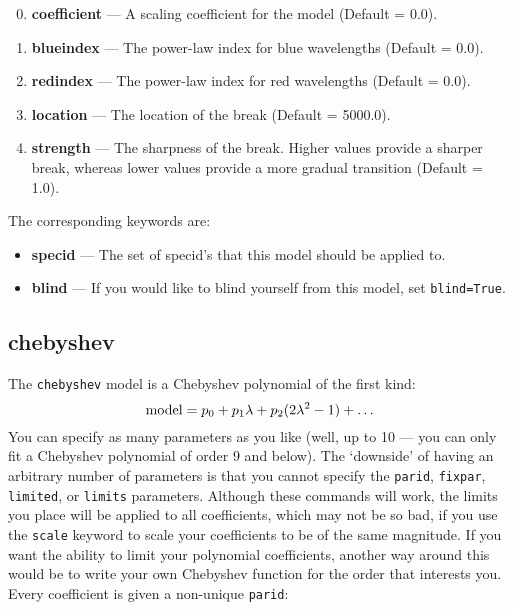\begin{enumerate}
\setcounter{enumi}{-1}
\item \textbf{coefficient} --- A scaling coefficient for the model (Default = 0.0).
\item \textbf{blueindex} --- The power-law index for blue wavelengths (Default = 0.0).
\item \textbf{redindex} --- The power-law index for red wavelengths (Default = 0.0).
\item \textbf{location} --- The location of the break (Default = 5000.0).
\item \textbf{strength} --- The sharpness of the break. Higher values provide a sharper break, whereas lower values provide a more gradual transition (Default = 1.0).
\end{enumerate}

The corresponding keywords are:

\begin{itemize}
\item \textbf{specid} --- The set of specid's that this model should be applied to.
\item \textbf{blind} --- If you would like to blind yourself from this model, set \texttt{blind=True}.
\end{itemize}


\subsection{chebyshev}

The \texttt{chebyshev} model is a Chebyshev polynomial of the first kind:
\begin{equation}
{\rm model}=p_0 + p_1\lambda + p_2(2\lambda^2 - 1) + \ldots
\end{equation}
You can specify as many parameters as you like (well, up to 10 --- you can
only fit a Chebyshev polynomial of order 9 and below). The `downside' of
having an arbitrary number of parameters is that you cannot specify the
\texttt{parid}, \texttt{fixpar}, \texttt{limited}, or \texttt{limits} parameters. Although
these commands will work, the limits you place will be applied to all coefficients,
which may not be so bad, if you use the \texttt{scale} keyword to scale your
coefficients to be of the same magnitude. If you want the ability to limit your
polynomial coefficients, another way around this would be to write your own
Chebyshev function for the  order that interests you. Every coefficient is given
a non-unique \texttt{parid}:

